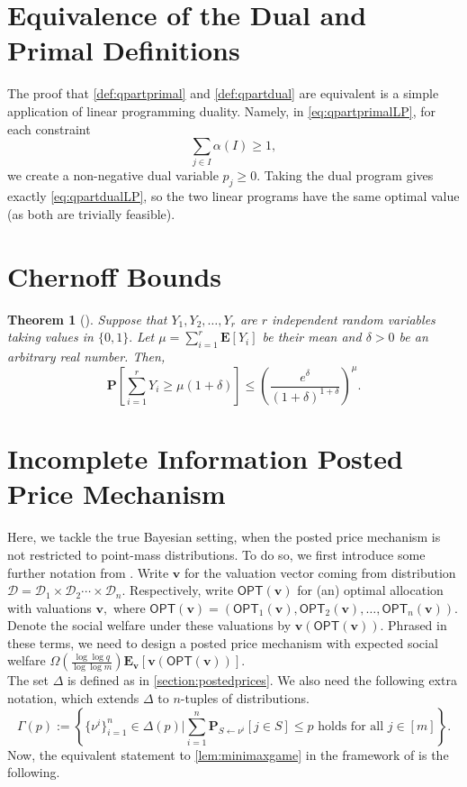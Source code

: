 \documentclass[11pt]{article}%
\newtheorem{theorem}{Theorem}
\numberwithin{theorem}{subsection}
\newcommand{\prob}{\mathbf{P}}
\newcommand{\boldv}{\mathbf{v}}
\newcommand{\opt}{\mathsf{OPT}}
\newcommand{\expect}{\mathbf{E}}
\begin{document}
\section{Equivalence of the Dual and Primal Definitions}
\label{section:definitionequivalence}
The proof that \cref{def:qpartprimal} and \cref{def:qpartdual} are equivalent is a simple application of 
linear programming duality. Namely, in \cref{eq:qpartprimalLP}, for each constraint 
$$
\sum_{j \in I}
\alpha(I)\ge 1, 
$$
we create a non-negative dual variable $p_j \ge 0.$ Taking the dual program gives exactly 
\cref{eq:qpartdualLP}, so the two linear programs have the same optimal value (as both are trivially feasible).


\section{Chernoff Bounds}
\begin{theorem}[{\cite[Theorem 4.4]{Mitzenmacher05}}]
\label{thm:chernoff}
Suppose that $Y_1, Y_2, \ldots, Y_r$ are $r$ independent random variables taking values in $\{0,1\}.$ Let $\mu = \sum_{i=1}^r \expect[Y_i]$ be their mean and $\delta>0$ be an arbitrary real number. Then,
$$
\prob\left[\sum_{i = 1}^r Y_i \ge \mu(1 + \delta)\right]
\le 
\left(
\frac{e^\delta}{(1+\delta)^{1+\delta}}
\right)^{\mu}.
$$
\end{theorem}

\section{Incomplete Information Posted Price Mechanism}\label{sec:incompleteposted}
Here, we tackle the true Bayesian setting, when the posted price mechanism is not restricted to point-mass distributions. To do so, we first introduce some further notation from \cite{DuttingKL20}. Write $\boldv$ for the valuation vector coming from distribution $\mathcal{D} = \mathcal{D}_1\times \mathcal{D}_2\cdots\times\mathcal{D}_n.$ Respectively, write $\opt(\boldv)$ for (an) optimal allocation with valuations $\boldv,$ where $\opt(\boldv) =  (\opt_1(\boldv),\opt_2(\boldv),\ldots, \opt_n(\boldv)).$ Denote the social welfare under these valuations by $\boldv(\opt(\boldv)).$ Phrased in these terms, we need to design a posted price mechanism with expected social welfare $\Omega\left(\frac{\log \log q}{\log \log m}\right)\expect_\boldv[\boldv(\opt(\boldv))].$\\

\noindent
The set $\Delta$ is defined as in \cref{section:postedprices}. We also need the following extra notation, which extends $\Delta$ to $n$-tuples of distributions.
$$
\Gamma(p):=
\left\{\{\nu^i\}_{i=1}^n \in \Delta(p)| \sum_{i=1}^n 
\prob_{S\longleftarrow \nu^i}[j \in S]\le p \text{ holds for all }j \in [m]\right\}.
$$
Now, the equivalent statement to 
\cref{lem:minimaxgame} in the framework of 
\cite{DuttingKL20}
is the following.
\end{document}

